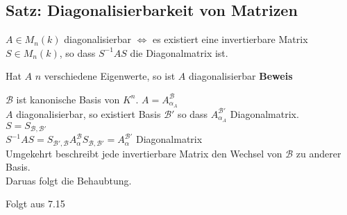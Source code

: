\subsection{Satz: Diagonalisierbarkeit von Matrizen}
		\item $A\in M_n(k)$ diagonalisierbar $\Leftrightarrow$ es existiert eine invertierbare Matrix $S\in M_n(k)$, so dass $S^{-1}AS$ die Diagonalmatrix ist.
		\item Hat $A$ $n$ verschiedene Eigenwerte, so ist $A$ diagonalisierbar
	\subExEnd
	\textbf{Beweis}
		\item $\mathcal{B}$ ist kanonische Basis von $K^n$. $A=A_{\alpha_A}^{\mathcal{B}}$\\
			$A$ diagonalisierbar, so existiert Basis $\mathcal{B}'$ so dass $A_{\alpha_A}^{\mathcal{B}'}$ Diagonalmatrix.\\
			$S=S_{\mathcal{B},\mathcal{B}'}$\\
			$S^{-1}AS=S_{\mathcal{B}',\mathcal{B}}A_\alpha^\mathcal{B}S_{\mathcal{B},\mathcal{B'}}=A_\alpha^{\mathcal{B}'}$ Diagonalmatrix\\
			Umgekehrt beschreibt jede invertierbare Matrix den Wechsel von $\mathcal{B}$ zu anderer Basis.\\
			Daruas folgt die Behaubtung.
		\item Folgt aus 7.15
	\subExEnd
